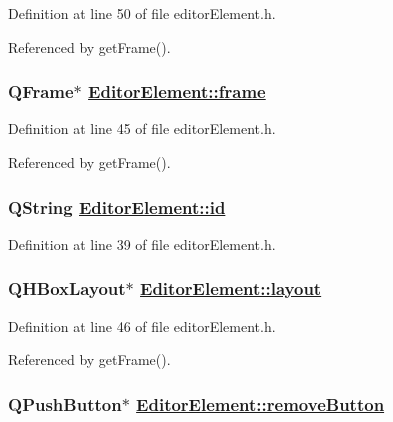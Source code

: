 Definition at line 50 of file editor\-Element.h.

Referenced by get\-Frame().\hypertarget{classEditorElement_r8}{
\subsubsection[frame]{\setlength{\rightskip}{0pt plus 5cm}QFrame$\ast$ \hyperlink{classEditorElement_r8}{Editor\-Element::frame}}}
\label{classEditorElement_r8}


Definition at line 45 of file editor\-Element.h.

Referenced by get\-Frame().\hypertarget{classEditorElement_r3}{
\subsubsection[id]{\setlength{\rightskip}{0pt plus 5cm}QString \hyperlink{classEditorElement_r3}{Editor\-Element::id}}}
\label{classEditorElement_r3}


Definition at line 39 of file editor\-Element.h.\hypertarget{classEditorElement_r9}{
\subsubsection[layout]{\setlength{\rightskip}{0pt plus 5cm}QHBox\-Layout$\ast$ \hyperlink{classEditorElement_r9}{Editor\-Element::layout}}}
\label{classEditorElement_r9}


Definition at line 46 of file editor\-Element.h.

Referenced by get\-Frame().\hypertarget{classEditorElement_r14}{
\subsubsection[removeButton]{\setlength{\rightskip}{0pt plus 5cm}QPush\-Button$\ast$ \hyperlink{classEditorElement_r14}{Editor\-Element::remove\-Button}}}
\label{classEditorElement_r14}



